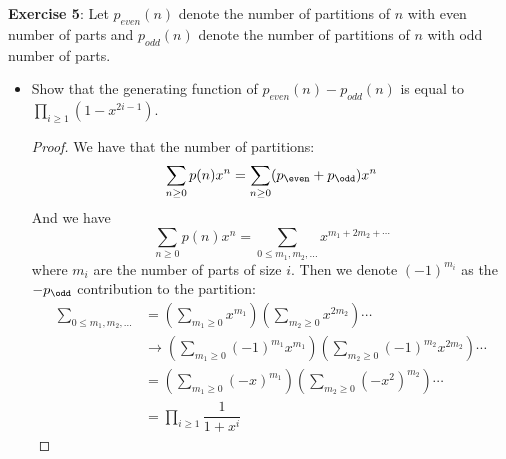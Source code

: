 \documentclass{article}
\begin{document}
\textbf{Exercise 5}: Let $p_{even}(n)$ denote the number of partitions of $n$ with even number of parts and $p_{odd }(n)$ denote the number of partitions of $n$ with odd number of parts.
    \begin{itemize}
        \item Show that the generating function of $p_{even}(n) - p_{odd}(n)$ is equal to $\prod_{i \geq 1}(1 - x^{2i - 1})$.
            \begin{proof}
                We have that the number of partitions:
                    \begin{equation*}
                        \sum_{n \geq 0}p(n)x^{n} = \sum_{n \geq 0} (p_{\even} + p_{\odd}) x^{n}
                    \end{equation*}
                And we have
                    \begin{equation*}
                        \sum_{n \geq 0} p(n) x^{n} = \sum_{0 \leq m_{1}, m_{2}, \ldots }x^{m_{1} + 2m_{2} + \cdots }
                    \end{equation*}
                where $m_{i}$ are the number of parts of size $i$. Then we denote $(-1)^{m_{i}}$ as the $-p_{\odd}$ contribution to the partition:
                    \begin{align*}
                        \sum_{0 \leq m_{1}, m_{2}, \ldots } &=                                                                                                                              \left(\sum_{m_{1} \geq 0}x^{m_{1}}\right)\left(\sum_{m_{2} \geq 0}x^{2m_{2}}\right)\cdots            \\
                                                            &\rightarrow \left(\sum_{m_{1} \geq 0}(-1)^{m_{1}}x^{m_{1}}\right)\left(\sum_{m_{2} \geq 0}(-1)^{m_{2}}x^{2m_{2}}\right) \cdots                                                                                                      \\
                                                            &=                                                                                                                              \left(\sum_{m_{1} \geq 0}(-x)^{m_{1}}\right)\left(\sum_{m_{2} \geq 0}(-x^{2})^{m_{2}}\right) \cdots  \\
                                                            &=                                                                                                                             \prod_{i \geq 1}\dfrac{1}{1 + x^{i}}                                                                                                        

\end{align*}
\end{proof}
\end{itemize}
\end{document}
